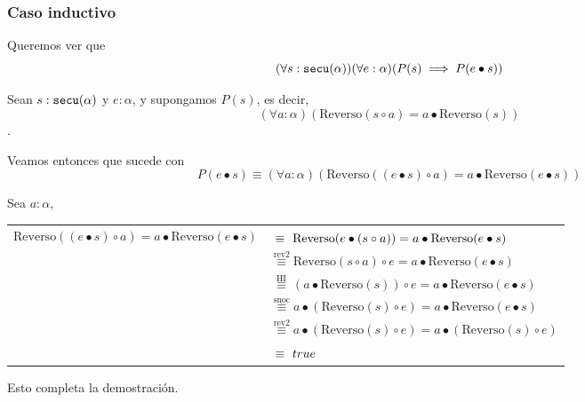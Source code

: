 \documentclass[hidelinks,a4paper,10pt, nofootinbib]{article}
\newcommand{\secu}{\ensuremath\texttt{secu}(\alpha)}
\newcommand{\rev}{\text{Reverso}}
\newcommand{\cons}{\bullet}
\newcommand{\snoc}{\circ}
\newcommand{\por}[1]{\overset{\text{#1}}{\equiv}}
\newcommand{\ph}{\phantom{rev1}}
\begin{document}
\subsubsection*{Caso inductivo}
Queremos ver que \[(\forall s : \secu) (\forall e : \alpha) (P(s) \implies P(e \cons s)) \]


Sean $s : \secu$ y $e : \alpha$, y supongamos $P(s)$, es decir, \[(\forall a : \alpha) (\rev(s \circ a) = a \cons \rev(s))\].


Veamos entonces que sucede con \[P(e \cons s) \equiv (\forall a : \alpha) (\rev((e \cons s) \circ a) = a \cons \rev(e \cons s))\]

Sea $ a : \alpha$, 
\begin{center}
\begin{tabular}{c l}
$\rev((e \cons s) \snoc a) = a \cons \rev(e \cons s)$ & $\por{\ph} \rev(e \cons (s \snoc a)) = a \cons \rev(e \cons s)$ \\
               & $\por{rev2} \rev(s \snoc a) \snoc e= a \cons \rev(e \cons s)$ \\
               & $\por{ HI } (a \cons \rev(s)) \snoc e= a \cons \rev(e \cons s)$ \\
               & $\por{snoc} a \cons (\rev(s) \snoc e) = a \cons \rev(e \cons s)$ \\
               & $\por{rev2} a \cons (\rev(s) \snoc e) = a \cons (\rev(s) \snoc e)$ \\
               & $\por{\ph} true$ \\
\end{tabular}
\end{center}


Esto completa la demostración.
\end{document}
